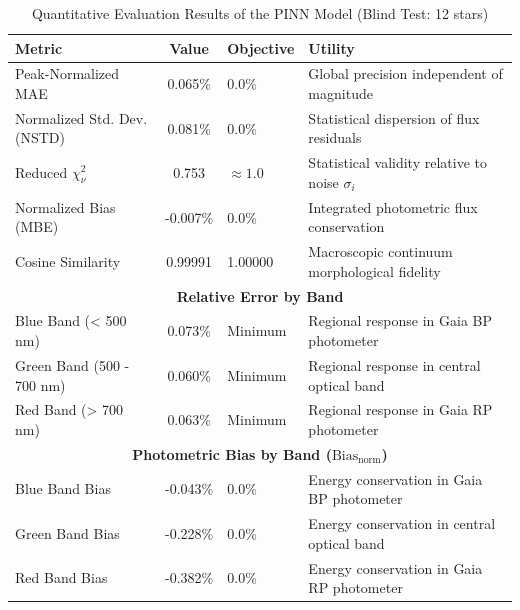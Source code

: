 
\begin{table}[htpb]
\centering
\caption{Quantitative Evaluation Results of the PINN Model (Blind Test: 12 stars)}
\label{tab:pinn_evaluation}
\begin{tabular}{lcll}
\hline
\textbf{Metric} & \textbf{Value} & \textbf{Objective} & \textbf{Utility} \\
\hline
Peak-Normalized MAE & 0.065\% & 0.0\% & Global precision independent of magnitude \\
Normalized Std. Dev. (NSTD) & 0.081\% & 0.0\% & Statistical dispersion of flux residuals \\
Reduced $\chi^2_\nu$ & 0.753 & $\approx 1.0$ & Statistical validity relative to noise $\sigma_i$ \\
Normalized Bias (MBE) & -0.007\% & 0.0\% & Integrated photometric flux conservation \\
Cosine Similarity & 0.99991 & 1.00000 & Macroscopic continuum morphological fidelity \\
\hline
\multicolumn{4}{c}{\textbf{Relative Error by Band}} \\
\hline
Blue Band (< 500 nm) & 0.073\% & Minimum & Regional response in Gaia BP photometer \\
Green Band (500 - 700 nm) & 0.060\% & Minimum & Regional response in central optical band \\
Red Band (> 700 nm) & 0.063\% & Minimum & Regional response in Gaia RP photometer \\
\hline
\multicolumn{4}{c}{\textbf{Photometric Bias by Band ($\text{Bias}_{\text{norm}}$)}} \\
\hline
Blue Band Bias & -0.043\% & 0.0\% & Energy conservation in Gaia BP photometer \\
Green Band Bias & -0.228\% & 0.0\% & Energy conservation in central optical band \\
Red Band Bias & -0.382\% & 0.0\% & Energy conservation in Gaia RP photometer \\
\hline
\end{tabular}
\end{table}
